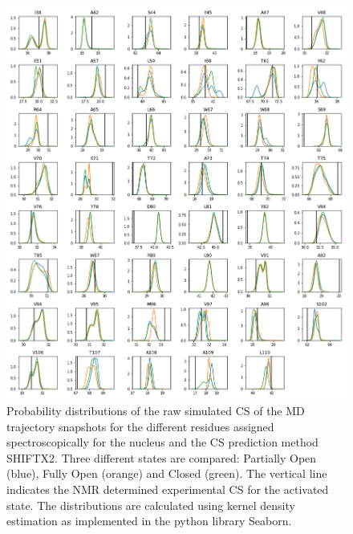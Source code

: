 \documentclass[%
 aip,
 amsmath,amssymb,
 preprint,%
]{revtex4-1}
\newcommand{\cb}{\ce{C_\beta} }
\begin{document}
\begin{figure}[tbp]
	\includegraphics[width=\textwidth]{figures_SI/hist_sparta_plus_CB.png}
	 \caption{\scriptsize
 Probability distributions of the raw simulated CS of the MD trajectory snapshots for the different residues assigned spectroscopically for the \cb nucleus and the CS prediction method SHIFTX2. Three different states are compared: Partially Open (blue), Fully Open (orange) and Closed (green). The vertical line indicates the NMR determined experimental CS for the activated state. The distributions are calculated using kernel density estimation as implemented in the python library Seaborn. 
}
\label{SI_hist6}
\end{figure}
\end{document}
